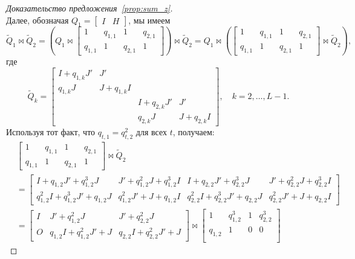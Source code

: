 \begin{proof}[Доказательство предложения~\ref{prop:sum_z}]
\[	\]
	Далее, обозначая $Q_1 = \begin{bmatrix} I & H \end{bmatrix}$, мы имеем
	\[
	{\widetilde Q}_1 \Join {\widetilde Q}_2 = \left(Q_1 \Join  
	\begin{bmatrix}
	1 & q_{1,1} & 1 & q_{2,1} \\
	q_{1,1} & 1 & q_{2,1} & 1
	\end{bmatrix}  \right)
	\Join
	{\widetilde Q}_2
	=
	Q_1 \Join  
	\left(
	\begin{bmatrix}
	1 & q_{1,1} & 1 & q_{2,1} \\
	q_{1,1} & 1 & q_{2,1} & 1
	\end{bmatrix}
	\Join
	{\widetilde Q}_2
	\right),
	\]
	где
	\begin{equation}\label{eq:proof:Q}
	{\widetilde Q}_k = 
	\begin{bmatrix}
	I + q_{1,k} J' & J' \\
	q_{1,k} J & J + q_{1,k} I \\
	& & I + q_{2,k} J' & J' \\
	& & q_{2,k} J & J + q_{2,k} I
	\end{bmatrix}, 
	\quad  
	k = 2,\dots,L-1.
	\end{equation}
	Используя тот факт, что $q_{t,1} = q_{t,2}^2$ для всех $t$, получаем:
	\[
	\begin{split}
	&\begin{bmatrix}
	1 & q_{1,1} & 1 & q_{2,1} \\
	q_{1,1} & 1 & q_{2,1} & 1
	\end{bmatrix}
	\Join
	{\widetilde Q}_2
	\\
	&=\begin{bmatrix}
	I + q_{1,2} J' + q_{1,2}^3 J & J' + q_{1,2}^2J + q_{1,2}^3 I & I + q_{2,2} J' + q_{2,2}^3 J & J' + q_{2,2}^2J + q_{2,2}^3 I \\
	q_{1,2}^2 I + q_{1,2}^3 J' + q_{1,2} J & q_{1,2}^2J'+ J + q_{1,2} I & q_{2,2}^2 I + q_{2,2}^3 J' + q_{2,2} J & q_{2,2}^2J'+ J + q_{2,2} I
	\end{bmatrix} 
	\\
	&= 
	\begin{bmatrix}
	I & J' + q_{1,2}^2 J &  J' + q_{2,2}^2 J \\
	O & q_{1,2}I + q_{1,2}^2 J' + J & q_{2,2}I + q_{2,2}^2 J' + J
	\end{bmatrix}
	\Join 
	\begin{bmatrix}
	1 & q_{1,2}^3 & 1 & q_{2,2}^3\\
	q_{1,2}& 1 & 0 & 0 \\

\end{bmatrix}
\end{split}\]
\end{proof}
